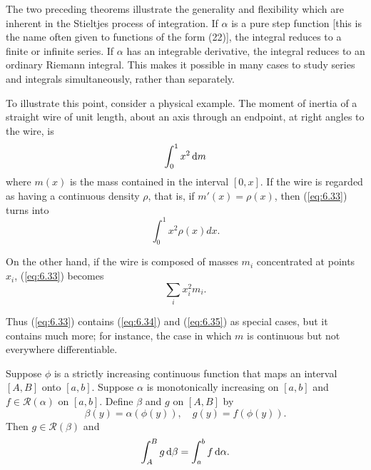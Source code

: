 \begin{myremark}
    \label{myremark:6.18}
    The two preceding theorems illustrate the generality and flexibility which are inherent in the Stieltjes process of integration. 
    If $\alpha$ is a pure step function 
    [this is the name often given to functions of the form (22)], 
    the integral reduces to a finite or infinite series. 
    If $\alpha$ has an integrable derivative, 
    the integral reduces to an ordinary Riemann integral. 
    This makes it possible in many cases to study series and integrals simultaneously, rather than separately.
    
    To illustrate this point, consider a physical example. 
    The moment of inertia of a straight wire of unit length, 
    about an axis through an endpoint, at right angles to the wire, is
    \begin{equation}
        \label{eq:6.33}
        \int_{0}^{1} x^2 \d m
    \end{equation}
    where $m(x)$ is the mass contained in the interval $[0, x]$. 
    If the wire is regarded as having a continuous density $\rho$, 
    that is, if $m'(x) = \rho(x)$, then (\ref{eq:6.33}) turns into
    \begin{equation}
        \label{eq:6.34}
        \int_{0}^{1} x^2 \rho(x) dx.
    \end{equation}
    
    On the other hand, 
    if the wire is composed of masses $m_i$ concentrated at points $x_i$, 
    (\ref{eq:6.33}) becomes
    \begin{equation}
        \label{eq:6.35}
        \sum_{i} x_i^2 m_i.
    \end{equation}
    
    Thus (\ref{eq:6.33}) contains (\ref{eq:6.34}) and (\ref{eq:6.35}) as special cases, but it contains much more; 
    for instance, the case in which $m$ is continuous but not everywhere differentiable.
\end{myremark}

\begin{thm}
    \label{thm:6.19}
    Suppose $\phi$ is a strictly increasing continuous function that
    maps an interval $[A, B]$ onto $[a, b]$. 
    Suppose $\alpha$ is monotonically increasing on $[a, b]$ and
    $f \in \mathscr{R}(\alpha)$ on $[a, b]$. 
    Define $\beta$ and $g$ on $[A, B]$ by
    \begin{equation}
        \label{eq:6.36}
        \beta(y) = \alpha(\phi(y)),
        \quad 
        g(y) = f(\phi(y)).
    \end{equation}
    Then $g \in \mathscr{R}(\beta)$ and 
    \begin{equation}
        \label{eq:6.37}
        \int_{A}^{B} g \d \beta =
        \int_{a}^{b} f \d \alpha.
    \end{equation}
\end{thm}
